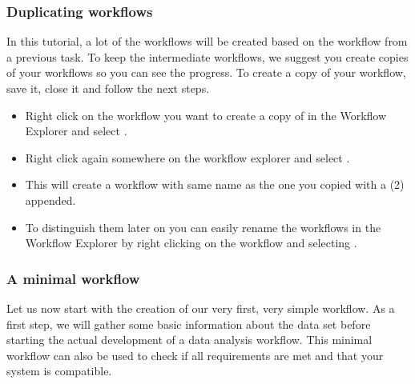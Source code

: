 \subsubsection{Duplicating workflows}
\label{sec:duplicate-wf}

In this tutorial, a lot of the workflows will be created based on the workflow from a previous task.
To keep the intermediate workflows, we suggest you create copies of your workflows so you can see the progress.
To create a copy of your workflow, save it, close it and follow the next steps.

\begin{itemize}
\item
Right click on the workflow you want to create a copy of in the Workflow Explorer and select .
\item
Right click again somewhere on the workflow explorer and select .
\item
This will create a workflow with same name as the one you copied with a (2) appended.
\item
To distinguish them later on you can easily rename the workflows in the Workflow Explorer by right clicking on the workflow and selecting . 
\end{itemize}

\subsubsection{A minimal workflow}
\label{sec:Minimal_Workflow}

Let us now start with the creation of our very first, very simple workflow.
As a first step, we will gather some basic information about the data set before starting the
actual development of a data analysis workflow. This minimal workflow can also be used to check if all requirements 
are met and that your system is compatible.

